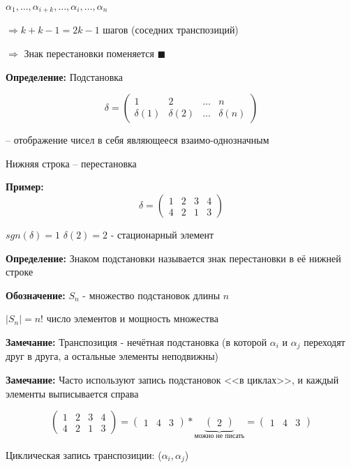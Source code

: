 \documentclass[a4paper,12pt]{article}
\begin{document}
	$\alpha_1, \ldots, \alpha_{i+k}, \ldots, \alpha_{i}, \ldots, \alpha_n$

	$\Rightarrow k + k - 1 = 2k - 1$ шагов (соседних транспозиций) 

	$\Rightarrow$ Знак перестановки поменяется $\blacksquare$

	{\bf Определение: } Подстановка

	\[
		\delta=
		\begin{pmatrix}
			1 & 2 & \ldots & n \\
			\delta(1) & \delta(2) & \ldots & \delta(n)
		\end{pmatrix}
	\]

	-- отображение чисел в себя являющееся взаимо-однозначным

	Нижняя строка -- перестановка

	{\bf Пример: }
	\[
		\delta =
		\begin{pmatrix}
			1 & 2 & 3 & 4 \\
			4 & 2 & 1 & 3
		\end{pmatrix}
	\]

	$sgn(\delta)=1$
	$\delta(2)=2$ - стационарный элемент

	{\bf Определение: } Знаком подстановки называется знак перестановки в её нижней строке

	{\bf Обозначение: } $S_n$ - множество подстановок длины $n$

	$|S_n|=n!$ число элементов и мощность множества

	{\bf Замечание: } Транспозиция - нечётная подстановка (в которой $\alpha_i$ и $\alpha_j$ переходят друг в друга, а остальные элементы неподвижны)

	{\bf Замечание: } Часто используют запись подстановок <<в циклах>>, и каждый элементы выписывается справа

	\[
		\begin{pmatrix}
			1 & 2 & 3 & 4 \\
			4 & 2 & 1 & 3
		\end{pmatrix}
		=
		\begin{pmatrix}
			1 & 4 & 3
		\end{pmatrix}
		*
		\underbrace{
			\begin{pmatrix}
				2
			\end{pmatrix}
		}_{\text{можно не писать}}
		=
		\begin{pmatrix}
			1 & 4 & 3
		\end{pmatrix}
	\]

	Циклическая запись транспозиции: ($\alpha_i, \alpha_j$)
\end{document}
